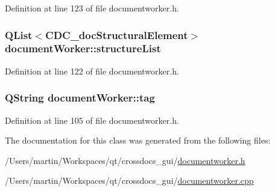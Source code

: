 Definition at line 123 of file documentworker.\+h.

\hypertarget{classdocument_worker_a18623c1f7f73e476f7c82a02e9752469}{
\subsubsection[{structure\+List}]{\setlength{\rightskip}{0pt plus 5cm}Q\+List$<${\bf C\+D\+C\+\_\+doc\+Structural\+Element}$>$ document\+Worker\+::structure\+List\hspace{0.3cm}{\ttfamily [private]}}}\label{classdocument_worker_a18623c1f7f73e476f7c82a02e9752469}


Definition at line 122 of file documentworker.\+h.

\hypertarget{classdocument_worker_a06432e8a28e33071cbb02d7739558ab0}{
\subsubsection[{tag}]{\setlength{\rightskip}{0pt plus 5cm}Q\+String document\+Worker\+::tag\hspace{0.3cm}{\ttfamily [private]}}}\label{classdocument_worker_a06432e8a28e33071cbb02d7739558ab0}


Definition at line 105 of file documentworker.\+h.



The documentation for this class was generated from the following files\+:\begin{DoxyCompactItemize}
\item 
/\+Users/martin/\+Workspaces/qt/crossdocs\+\_\+gui/\hyperlink{documentworker_8h}{documentworker.\+h}\item 
/\+Users/martin/\+Workspaces/qt/crossdocs\+\_\+gui/\hyperlink{documentworker_8cpp}{documentworker.\+cpp}\end{DoxyCompactItemize}
